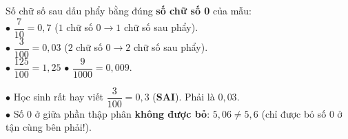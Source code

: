 \documentclass[14pt,a4paper,oneside]{extbook}
\begin{document}
\noindent
\begin{minipage}[t]{0.54\textwidth}
  \begin{tcolorbox}[
    enhanced,
    title={\footnotesize\bfseries\color{white}\faBolt\ Đổi nhanh Phân số thập phân $\leftrightarrow$ STP},
    colback=green!3!white,
    colframe=green!60!black,
    arc=2.5mm, boxrule=0.8pt, top=1.8mm, bottom=1.8mm, left=2.2mm, right=2.2mm
  ]
    \footnotesize
    Số chữ số sau dấu phẩy bằng đúng \textbf{số chữ số 0} của mẫu:\\
    $\bullet$ $\dfrac{7}{10} = 0,7$ ($1$ chữ số $0 \rightarrow 1$ chữ số sau phẩy).\\
    $\bullet$ $\dfrac{3}{100} = 0,03$ ($2$ chữ số $0 \rightarrow 2$ chữ số sau phẩy).\\
    $\bullet$ $\dfrac{125}{100} = 1,25$ \qquad $\bullet$ $\dfrac{9}{1000} = 0,009$.
  \end{tcolorbox}
\end{minipage}%
\hfill
\begin{minipage}[t]{0.44\textwidth}
  \begin{tcolorbox}[
    enhanced,
    title={\footnotesize\bfseries\color{white}\faExclamationTriangle\ Mẹo tránh bẫy trắc nghiệm},
    colback=red!2!white,
    colframe=red!70!black,
    arc=2.5mm, boxrule=0.8pt, top=1.8mm, bottom=1.8mm, left=2.2mm, right=2.2mm
  ]
    \footnotesize
    $\bullet$ Học sinh rất hay viết $\dfrac{3}{100} = 0,3$ (\textbf{SAI}). Phải là $0,03$.\\
    $\bullet$ Số $0$ ở giữa phần thập phân \textbf{không được bỏ}: $5,06 \neq 5,6$ (chỉ được bỏ số $0$ ở tận cùng bên phải!).
  \end{tcolorbox}
\end{minipage}
\end{document}
